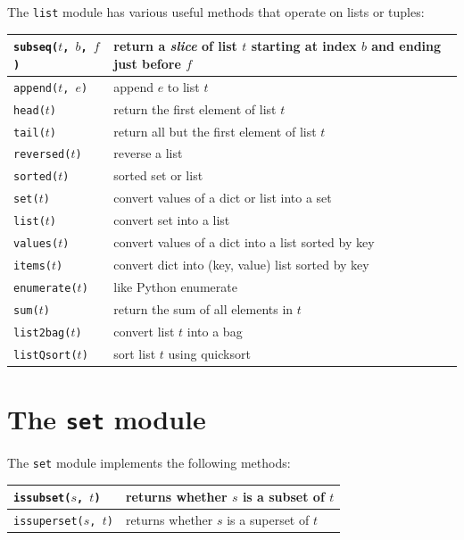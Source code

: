\documentclass{report}
\begin{document}
%
The \texttt{list} module has various useful methods that operate on lists
or tuples:

\vspace{1em}
\begin{tabular}{|l|l|}
\hline
\texttt{subseq($t$, $b$, $f$)} & return a \emph{slice} of list $t$ starting
at index $b$ and ending just before $f$\\
\hline
\texttt{append($t$, $e$)} & append $e$ to list $t$\\
\hline
\texttt{head($t$)} & return the first element of list $t$\\
\hline
\texttt{tail($t$)} & return all but the first element of list $t$\\
\hline
\texttt{reversed($t$)} & reverse a list \\
\hline
\texttt{sorted($t$)} & sorted set or list \\
\hline
\texttt{set($t$)} & convert values of a dict or list into a set \\
\hline
\texttt{list($t$)} & convert set into a list \\
\hline
\texttt{values($t$)} & convert values of a dict into a list sorted by key \\
\hline
\texttt{items($t$)} & convert dict into (key, value) list sorted by key \\
\hline
\texttt{enumerate($t$)} & like Python enumerate \\
\hline
\texttt{sum($t$)} & return the sum of all elements in $t$\\
\hline
\texttt{list2bag($t$)} & convert list $t$ into a bag \\
\hline
\texttt{listQsort($t$)} & sort list $t$ using quicksort\\
\hline
\end{tabular}

\section{The \texttt{set} module}

The \texttt{set} module
%
implements the following methods:

\vspace{1em}
\begin{tabular}{|l|l|}
\hline
\texttt{issubset($s$, $t$)} & returns whether $s$ is a subset of $t$ \\
\hline
\texttt{issuperset($s$, $t$)} & returns whether $s$ is a superset of $t$ \\
\hline
\end{tabular}
\end{document}
